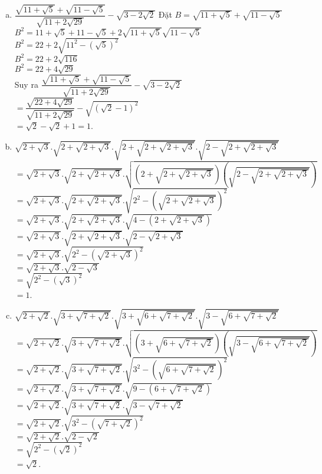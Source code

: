 \begin{bt}
{\begin{enumerate}[a)]
			$=\dfrac{\sqrt{2(\sqrt{7}-2)}}{\sqrt{\sqrt{7}-2}}$\\
			$=\sqrt{2}$.
			\item  $\dfrac{\sqrt{11+\sqrt{5}}+\sqrt{11-\sqrt{5}}}{\sqrt{11+2\sqrt{29}}}-\sqrt{3-2\sqrt{2}} $
			Đặt $B=\sqrt{11+\sqrt{5}}+\sqrt{11-\sqrt{5}}$\\ 
			$B^2=11+\sqrt{5}+11-\sqrt{5}+2\sqrt{11+\sqrt{5}}\sqrt{11-\sqrt{5}}$\\
			$B^2=22+2\sqrt{11^2-(\sqrt{5})^2}$\\
			$B^2=22+2\sqrt{116}$\\
			$B^2=22+4\sqrt{29}$\\
			Suy ra $\dfrac{\sqrt{11+\sqrt{5}}+\sqrt{11-\sqrt{5}}}{\sqrt{11+2\sqrt{29}}}-\sqrt{3-2\sqrt{2}} $\\
			$=\dfrac{\sqrt{22+4\sqrt{29}}}{\sqrt{11+2\sqrt{29}}}- \sqrt{(\sqrt{2}-1)^2}$\\
			$=\sqrt{2}-\sqrt{2}+1=1$.
			\item  $\sqrt{2+\sqrt{3}}.\sqrt{2+\sqrt{2+\sqrt{3}}}.\sqrt{2+\sqrt{2+\sqrt{2+\sqrt{3}}}}.\sqrt{2-\sqrt{2+\sqrt{2+\sqrt{3}}}}$\\
			$=\sqrt{2+\sqrt{3}}.\sqrt{2+\sqrt{2+\sqrt{3}}}.\sqrt{\left( 2+\sqrt{2+\sqrt{2+\sqrt{3}}}\right) \left( \sqrt{2-\sqrt{2+\sqrt{2+\sqrt{3}}}}\right) }$\\
			$=\sqrt{2+\sqrt{3}}.\sqrt{2+\sqrt{2+\sqrt{3}}}.\sqrt{2^2-(\sqrt{2+\sqrt{2+\sqrt{3}}})^2}$\\
			$=\sqrt{2+\sqrt{3}}.\sqrt{2+\sqrt{2+\sqrt{3}}}.\sqrt{4-\left( 2+\sqrt{2+\sqrt{3}}\right) }$\\
			$=\sqrt{2+\sqrt{3}}.\sqrt{2+\sqrt{2+\sqrt{3}}}.\sqrt{2-\sqrt{2+\sqrt{3}}}$\\
			$=\sqrt{2+\sqrt{3}}.\sqrt{2^2-\left( \sqrt{2+\sqrt{3}}\right) ^2}$\\
			$=\sqrt{2+\sqrt{3}}.\sqrt{2-\sqrt{3}}$\\
			$=\sqrt{2^2-(\sqrt{3})^2}$\\
			$=1$.
			\item $\sqrt{2+\sqrt{2}}.\sqrt{3+\sqrt{7+\sqrt{2}}}.\sqrt{3+\sqrt{6+\sqrt{7+\sqrt{2}}}}.\sqrt{3-\sqrt{6+\sqrt{7+\sqrt{2}}}}$	\\
			$=\sqrt{2+\sqrt{2}}.\sqrt{3+\sqrt{7+\sqrt{2}}}.\sqrt{(3+\sqrt{6+\sqrt{7+\sqrt{2}}})\left( \sqrt{3-\sqrt{6+\sqrt{7+\sqrt{2}}}}\right) }$\\
			$=\sqrt{2+\sqrt{2}}.\sqrt{3+\sqrt{7+\sqrt{2}}}.\sqrt{3^2-\left( \sqrt{6+\sqrt{7+\sqrt{2}}}\right) ^2}$\\
			$=\sqrt{2+\sqrt{2}}.\sqrt{3+\sqrt{7+\sqrt{2}}}.\sqrt{9-(6+\sqrt{7+\sqrt{2}})}$\\
			$=\sqrt{2+\sqrt{2}}.\sqrt{3+\sqrt{7+\sqrt{2}}}.\sqrt{3-\sqrt{7+\sqrt{2}}}$\\
			$=\sqrt{2+\sqrt{2}}.\sqrt{3^2-\left( \sqrt{7+\sqrt{2}}\right) ^2}$\\
			$=\sqrt{2+\sqrt{2}}.\sqrt{2-\sqrt{2}}$\\
			$=\sqrt{2^2-(\sqrt{2})^2}$\\
			$=\sqrt{2}$.
	\end{enumerate}	}
\end{bt}

